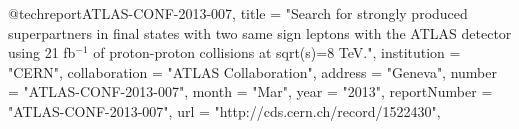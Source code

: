 @techreport{ATLAS-CONF-2013-007,
      title         = "{Search for strongly produced superpartners in final
                       states with two same sign leptons with the ATLAS detector
                       using 21 fb$^{-1}$ of proton-proton collisions at sqrt(s)=8
                       TeV.}",
      institution   = "CERN",
      collaboration = "ATLAS Collaboration",
      address       = "Geneva",
      number        = "ATLAS-CONF-2013-007",
      month         = "Mar",
      year          = "2013",
      reportNumber  = "ATLAS-CONF-2013-007",
      url           = "http://cds.cern.ch/record/1522430",
}

